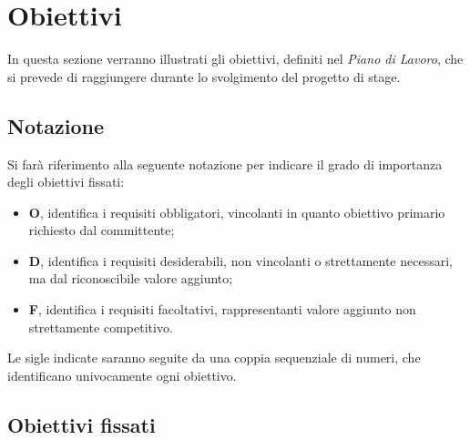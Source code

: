\section{Obiettivi}
\label{sec:obiettivi}

In questa sezione verranno illustrati gli obiettivi, definiti nel \emph{Piano di Lavoro}, che si prevede di raggiungere durante lo svolgimento del progetto di stage.

\subsection{Notazione}
\label{subsec:notazione}

Si farà riferimento alla seguente notazione per indicare il grado di importanza degli obiettivi fissati:
\begin{itemize}
    \item \textbf{O}, identifica i requisiti obbligatori, vincolanti in quanto obiettivo primario richiesto dal committente;
    \item \textbf{D}, identifica i requisiti desiderabili, non vincolanti o strettamente necessari, ma dal riconoscibile valore aggiunto;
    \item \textbf{F}, identifica i requisiti facoltativi, rappresentanti valore aggiunto non strettamente competitivo.
\end{itemize}
Le sigle indicate saranno seguite da una coppia sequenziale di numeri, che identificano univocamente ogni obiettivo.

\subsection{Obiettivi fissati}
\label{subsec:obiettivi-fissati}

